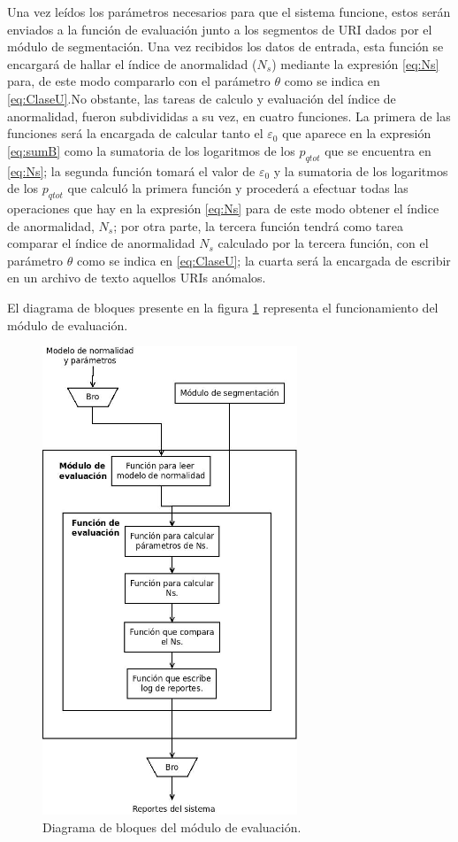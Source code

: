 Una vez leídos los parámetros necesarios para que el sistema funcione, estos serán enviados a la función de evaluación junto a los segmentos de URI dados por el módulo de segmentación. Una vez recibidos los datos de entrada, esta función se encargará de hallar el índice de anormalidad ($N_{s}$) mediante la expresión \ref{eq:Ns} para, de este modo compararlo con el parámetro $\theta$ como se indica en \ref{eq:ClaseU}.No obstante, las tareas de calculo y evaluación del índice de anormalidad, fueron subdivididas a su vez, en cuatro funciones. La primera de las funciones será la encargada de calcular tanto el $\varepsilon_{0}$ que aparece en la expresión \ref{eq:sumB} como la sumatoria de los logaritmos de los $p_{qtot}$ que se encuentra en \ref{eq:Ns}; la segunda función tomará el valor de $\varepsilon_{0}$ y la sumatoria de los logaritmos de los $p_{qtot}$ que calculó la primera función y procederá a efectuar todas las operaciones que hay en la expresión \ref{eq:Ns} para de este modo obtener el índice de anormalidad, $N_{s}$; por otra parte, la tercera función tendrá como tarea comparar el índice de anormalidad $N_{s}$ calculado por la tercera función, con el parámetro $\theta$ como se indica en \ref{eq:ClaseU}; la cuarta será la encargada de escribir en un archivo de texto aquellos URIs anómalos.

El diagrama de bloques presente en la figura \ref{fig:arquiEvaluacion} representa el funcionamiento del módulo de evaluación.

\begin{figure}[!htb]
\begin{center}
\includegraphics[width=3in]{./img/evalArqui.jpeg}
\caption{Diagrama de bloques del módulo de evaluación.}
\label{fig:arquiEvaluacion}
\end{center}
\end{figure}

